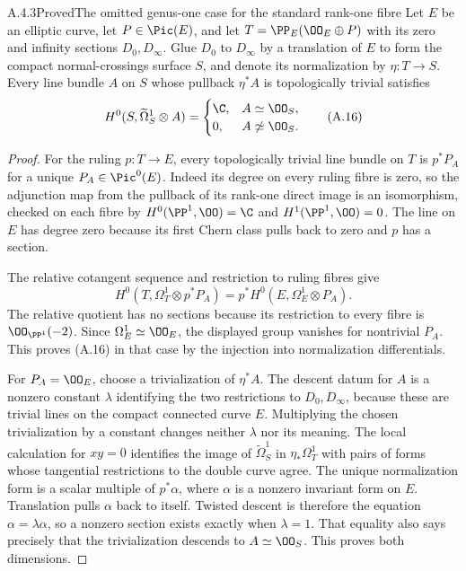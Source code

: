 \begin{statement}{A.4.3}{Proved}{The omitted genus-one case for the standard rank-one fibre}
Let $E$ be an elliptic curve, let $P\in\Pic(E)$, and let $T=\PP_E(\OO_E\oplus P)$ with its zero and infinity sections $D_0,D_\infty$. Glue $D_0$ to $D_\infty$ by a translation of $E$ to form the compact normal-crossings surface $S$, and denote its normalization by $\eta:T\to S$. Every line bundle $A$ on $S$ whose pullback $\eta^*A$ is topologically trivial satisfies
\[
H^0(S,\widetilde\Omega_S^1\otimes A)=
\begin{cases}\C,&A\simeq\OO_S,\\0,&A\not\simeq\OO_S.\end{cases}
\tag{A.16}
\]
\end{statement}
\begin{proof}
For the ruling $p:T\to E$, every topologically trivial line bundle on $T$ is $p^*P_A$ for a unique $P_A\in\Pic^0(E)$. Indeed its degree on every ruling fibre is zero, so the adjunction map from the pullback of its rank-one direct image is an isomorphism, checked on each fibre by $H^0(\PP^1,\OO)=\C$ and $H^1(\PP^1,\OO)=0$. The line on $E$ has degree zero because its first Chern class pulls back to zero and $p$ has a section.

The relative cotangent sequence and restriction to ruling fibres give
\[
 H^0(T,\Omega_T^1\otimes p^*P_A)
 =p^*H^0(E,\Omega_E^1\otimes P_A).
\]
The relative quotient has no sections because its restriction to every fibre is $\OO_{\PP^1}(-2)$. Since $\Omega_E^1\simeq\OO_E$, the displayed group vanishes for nontrivial $P_A$. This proves (A.16) in that case by the injection into normalization differentials.

For $P_A=\OO_E$, choose a trivialization of $\eta^*A$. The descent datum for $A$ is a nonzero constant $\lambda$ identifying the two restrictions to $D_0,D_\infty$, because these are trivial lines on the compact connected curve $E$. Multiplying the chosen trivialization by a constant changes neither $\lambda$ nor its meaning. The local calculation for $xy=0$ identifies the image of $\widetilde\Omega_S^1$ in $\eta_*\Omega_T^1$ with pairs of forms whose tangential restrictions to the double curve agree. The unique normalization form is a scalar multiple of $p^*\alpha$, where $\alpha$ is a nonzero invariant form on $E$. Translation pulls $\alpha$ back to itself. Twisted descent is therefore the equation $\alpha=\lambda\alpha$, so a nonzero section exists exactly when $\lambda=1$. That equality also says precisely that the trivialization descends to $A\simeq\OO_S$. This proves both dimensions.
\end{proof}

